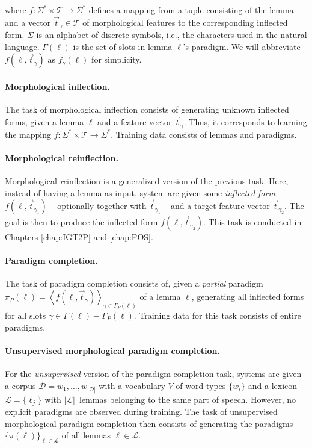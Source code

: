 \noindent where $f : \Sigma^* \times \mathcal{T} \to \Sigma^*$ defines a mapping from a tuple consisting of the lemma and a vector $\vec{t}_\gamma \in \mathcal{T}$ of morphological features to the corresponding inflected form. $\Sigma$ is an alphabet of discrete symbols, i.e., the characters used in the natural language. $\Gamma(\ell)$ is the set of slots in lemma $\ell$'s paradigm. 
We will abbreviate $f(\ell, \vec{t}_\gamma)$ as $f_{\gamma}(\ell)$ for simplicity.


\paragraph{Morphological inflection.}
The task of morphological inflection consists of generating unknown inflected forms, given a lemma 
$\ell$ and a feature vector $\vec{t}_\gamma$. Thus, it corresponds to learning the mapping $f : \Sigma^* \times \mathcal{T} \to \Sigma^*$. Training data consists of lemmas and paradigms.


\paragraph{Morphological reinflection. }
Morphological \textit{re}inflection is a generalized version of the previous task. Here, instead of having a lemma as input, system are given some \textit{inflected form}  
$f(\ell, \vec{t}_{\gamma_1})$ -- optionally together with $\vec{t}_{\gamma_1}$ -- and a target feature vector $\vec{t}_{\gamma_2}$. The goal is then to produce the inflected form $f(\ell, \vec{t}_{\gamma_2})$. This task is conducted in Chapters \ref{chap:IGT2P} and \ref{chap:POS}.


\paragraph{Paradigm completion. }
The task of paradigm completion consists of, given a \textit{partial} paradigm $\pi_P(\ell) = \left\langle f(\ell, \vec{t}_\gamma)\right\rangle_{\gamma \in \Gamma_P(\ell)}$ of a lemma $\ell$, generating all inflected forms for all slots $\gamma \in \Gamma(\ell) - \Gamma_P(\ell)$.
Training data for this task consists of entire paradigms.

\paragraph{Unsupervised morphological paradigm completion. } For the \textit{unsupervised} version of the paradigm completion task, systems are given a corpus $\mathcal{D}=w_1,\dots,w_{|\mathcal{D}|}$ with a vocabulary $V$ of word types $\{w_i\}$ and a lexicon $\mathcal{L} = \{\ell_j\}$ with $|\mathcal{L}|$~lemmas belonging to the same part of speech. However, no explicit paradigms are observed during training.
The task of unsupervised morphological paradigm completion then consists of
generating the paradigms~$\{\pi(\ell)\}_{\ell\in\mathcal{L}}$ of all lemmas $\ell \in \mathcal{L}$.




